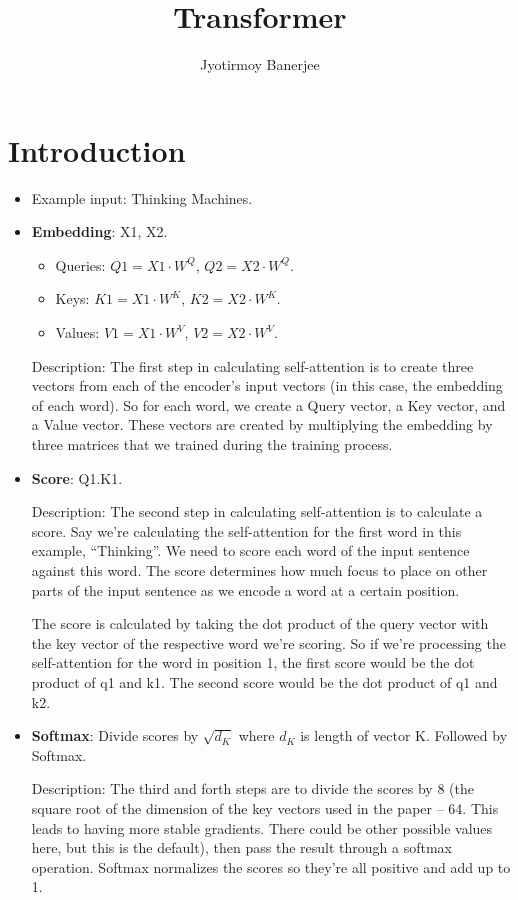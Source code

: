 \documentclass{article}
\title{Transformer}
\author{Jyotirmoy Banerjee}
\begin{document}
\maketitle

\section{Introduction}

\begin{itemize}
\item Example input: Thinking Machines.
\item \textbf{Embedding}: X1, X2.

\begin{itemize}
\item Queries: $Q1 = X1 \cdot W^Q$, $Q2 = X2 \cdot W^Q$.
\item Keys: $K1 = X1 \cdot W^K$, $K2 = X2 \cdot W^K$.  
\item Values: $V1 = X1 \cdot W^V$, $V2 = X2 \cdot W^V$. 
\end{itemize}
Description: The first step in calculating self-attention is to create three vectors from each of the encoder’s input vectors (in this case, the embedding of each word). So for each word, we create a Query vector, a Key vector, and a Value vector. These vectors are created by multiplying the embedding by three matrices that we trained during the training process.

\item \textbf{Score}: Q1.K1.

Description: The second step in calculating self-attention is to calculate a score. Say we’re calculating the self-attention for the first word in this example, ``Thinking''. We need to score each word of the input sentence against this word. The score determines how much focus to place on other parts of the input sentence as we encode a word at a certain position.

The score is calculated by taking the dot product of the query vector with the key vector of the respective word we’re scoring. So if we’re processing the self-attention for the word in position 1, the first score would be the dot product of q1 and k1. The second score would be the dot product of q1 and k2.

\item \textbf{Softmax}: Divide scores by $\sqrt{d_K}$ where $d_K$ is length of vector K. Followed by Softmax.

Description: The third and forth steps are to divide the scores by 8 (the square root of the dimension of the key vectors used in the paper – 64. This leads to having more stable gradients. There could be other possible values here, but this is the default), then pass the result through a softmax operation. Softmax normalizes the scores so they’re all positive and add up to 1.


\end{itemize}
\end{document}
